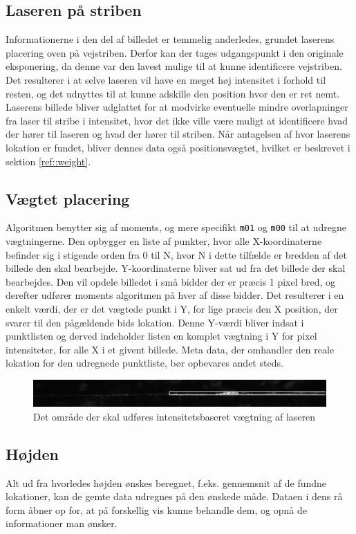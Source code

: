 \subsection{Laseren på striben}
Informationerne i den del af billedet er temmelig anderledes, grundet laserens placering oven på vejstriben. Derfor kan der tages udgangspunkt i den originale eksponering, da denne var den lavest mulige til at kunne identificere vejstriben. Det resulterer i at selve laseren vil have en meget høj intensitet i forhold til resten, og det udnyttes til at kunne adskille den position hvor den er ret nemt. Laserens billede bliver udglattet for at modvirke eventuelle mindre overlapninger fra laser til stribe i intensitet, hvor det ikke ville være muligt at identificere hvad der hører til laseren og hvad der hører til striben. Når antagelsen af hvor laserens lokation er fundet, bliver dennes data også positionsvægtet, hvilket er beskrevet i sektion \ref{ref::weight}.

\subsection{Vægtet placering\label{ref::weight}}
Algoritmen benytter sig af moments, og mere specifikt \texttt{m01} og \texttt{m00} til at udregne vægtningerne.
Den opbygger en liste af punkter, hvor alle X-koordinaterne befinder sig i stigende orden fra 0 til N, hvor N i dette tilfælde er bredden af det billede den skal bearbejde.
Y-koordinaterne bliver sat ud fra det billede der skal bearbejdes. Den vil opdele billedet i små bidder der er præcis 1 pixel bred, og derefter udfører moments algoritmen på hver af disse bidder. Det resulterer i en enkelt værdi, der er det vægtede punkt i Y, for lige præcis den X position, der svarer til den pågældende bids lokation. Denne Y-værdi bliver indsat i punktlisten og derved indeholder listen en komplet vægtning i Y for pixel intensiteter, for alle X i et givent billede. Meta data, der omhandler den reale lokation for den udregnede punktliste, bør opbevares andet steds.

\begin{figure}[h]
	\centering
	\includegraphics[width=0.7\linewidth]{Billeder/base_5_boxing}
	\caption{Det område der skal udføres intensitetsbaseret vægtning af laseren}
	\label{fig:base_5_boxing}
\end{figure}

\subsection{Højden}
Alt ud fra hvorledes højden ønskes beregnet, f.eks. gennemsnit af de fundne lokationer, kan de gemte data udregnes på den ønskede måde. Dataen i dens rå form åbner op for, at på forskellig vis kunne behandle dem, og opnå de informationer man ønsker.
